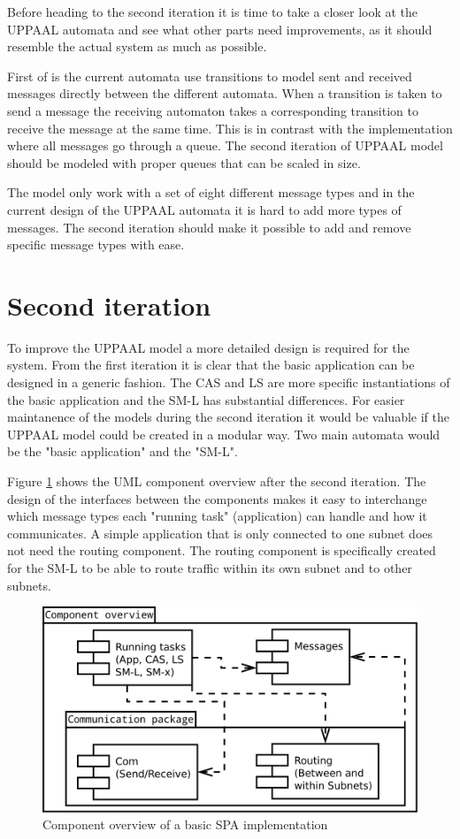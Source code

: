Before heading to the second iteration it is time to take a closer look at the
UPPAAL automata and see what other parts need improvements, as it should
resemble the actual system as much as possible.

First of is the current automata use transitions to model sent and
received messages directly between the different automata. When a transition is
taken to send a message the receiving automaton takes a corresponding
transition to receive the message at the same time. This is in contrast with the
implementation where all messages go through a queue. The second iteration of
UPPAAL model should be modeled with proper queues that can be scaled in size.

The model only work with a set of eight different message types and in the
current design of the UPPAAL automata it is hard to add more types of messages.
The second iteration should make it possible to add and remove
specific message types with ease.

\section{Second iteration}
To improve the UPPAAL model a more detailed design is required for the system.
From the first iteration it is clear that the basic application can be designed
in a generic fashion. The CAS and LS are more specific instantiations of the
basic application and the SM-L has substantial differences. For easier
maintanence of the models during the second iteration it would be valuable if
the UPPAAL model could be created in a modular way. Two main automata would be the
"basic application" and the "SM-L".

Figure \ref{fig:iteration2_uml_component_overview} shows the UML component
overview after the second iteration. The design of the interfaces between the
components makes it easy to interchange which message types each "running task"
(application) can handle and how it communicates. A simple application that is
only connected to one subnet does not need the routing component. The routing
component is specifically created for the SM-L to be able to route traffic
within its own subnet and to other subnets.

\begin{figure}[h]
    \centering
    \includegraphics[width=\textwidth]{figures/iteration2_uml_component_overview}
    \caption{Component overview of a basic SPA implementation}
    \label{fig:iteration2_uml_component_overview}
\end{figure}

